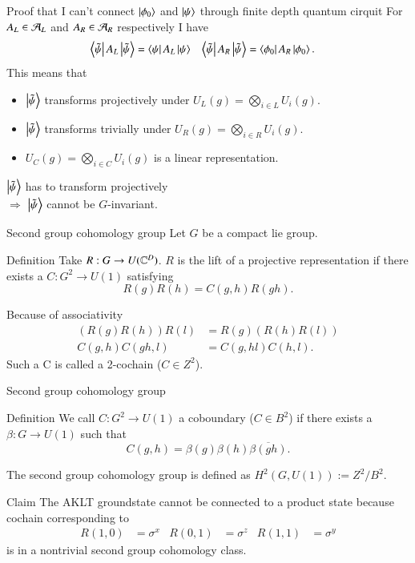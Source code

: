 \documentclass{beamer}
\begin{document}
\begin{frame}{Proof that I can't connect $\ket{\phi_0}$ and $\ket{\psi}$ through finite depth quantum cirquit}
	For $A_L\in\AA_L$ and $A_R\in\AA_R$ respectively I have
	\begin{align}
		\bra{\tilde\psi}A_L\ket{\tilde{\psi}}&=\bra{\psi}A_L\ket{\psi}&\bra{\tilde\psi}A_R\ket{\tilde{\psi}}&=\bra{\phi_0}A_R\ket{\phi_0}.
	\end{align}
	\pause
	This means that
	\begin{itemize}
		\item $\ket{\tilde{\psi}}$ transforms projectively under $U_L(g)=\bigotimes_{i \in L}U_i(g)$.
		\item $\ket{\tilde{\psi}}$ transforms trivially under $U_R(g)=\bigotimes_{i \in R}U_i(g)$.
		\item <3->$U_C(g)=\bigotimes_{i\in C}U_i(g)$ is a linear representation.
	\end{itemize}
	\pause
	\pause
	$\ket{\tilde{\psi}}$ has to transform projectively\\
	\pause
	$\Rightarrow$ $\ket{\tilde{\psi}}$ cannot be $G$-invariant.
\end{frame}

\begin{frame}{Second group cohomology group}
	Let $G$ be a compact lie group.
	\begin{block}{Definition}
		Take $R:G\rightarrow U(\CC^D)$. $R$ is the lift of a projective representation if there exists a $C:G^2\rightarrow U(1)$ satisfying
		\[R(g)R(h)=C(g,h)R(gh).\]
	\end{block}
	\pause
	Because of associativity
	\begin{align*}
		(R(g)R(h))R(l)&=R(g)(R(h)R(l))\\
		C(g,h)C(gh,l)&=C(g,hl)C(h,l).
	\end{align*}
	Such a C is called a 2-cochain ($C\in Z^2$).
\end{frame}

\begin{frame}{Second group cohomology group}
	\begin{block}{Definition}
		We call $C:G^2\rightarrow U(1)$ a coboundary ($C\in B^2$) if there exists a $\beta:G\rightarrow U(1)$ such that
		\[C(g,h)=\beta(g)\beta(h)\overline{\beta(gh)}.\]
	\end{block}
	The second group cohomology group is defined as $H^2(G,U(1)):=Z^2/B^2$.
	\pause
	\begin{block}{Claim}
		The AKLT groundstate cannot be connected to a product state because cochain corresponding to
		\begin{align*}
			R(1,0)&=\sigma^x&R(0,1)&=\sigma^z&R(1,1)&=\sigma^y
		\end{align*}
		is in a nontrivial second group cohomology class.
	\end{block}
\end{frame}
\end{document}
